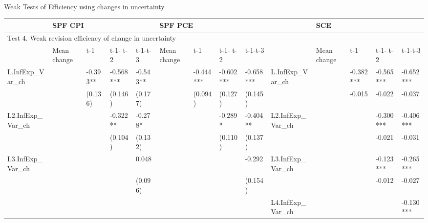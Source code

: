 \documentclass{beamer}
\begin{document}
\begin{frame}{Weak Tests of Efficiency using changes in uncertainty}
\begin{adjustbox}{width=\textwidth}
	\begin{threeparttable}
				\label{WeakRevEfficiency}
		\begin{tabular}{llllllllllllll}
			\hline 
			& \multicolumn{4}{l}{SPF CPI}                     & \multicolumn{4}{l}{SPF PCE}                       &                      & \multicolumn{4}{l}{SCE}                           \\
			\hline 
			\multicolumn{14}{l}{Test 4. Weak revision efficiency of change in uncertainty}                \\
			\hline                                                                                                                 
			& Mean change & t-1       & t-1- t-2  & t-1-t-3   & Mean change   & t-1       & t-1- t-2  & t-1-t-3   &                      & Mean change   & t-1       & t-1- t-2  & t-1-t-3   \\
			\hline 
			L.InfExp\_Var\_ch    &             & -0.393**  & -0.568*** & -0.543**  &               & -0.444*** & -0.602*** & -0.658*** & L.InfExp\_Var\_ch    &               & -0.382*** & -0.565*** & -0.652*** \\
			&             & (0.136)   & (0.146)   & (0.177)   &               & (0.094)   & (0.127)   & (0.145)   &                      &               & -0.015    & -0.022    & -0.037    \\
			L2.InfExp\_Var\_ch   &             &           & -0.322**  & -0.278*   &               &           & -0.289*   & -0.404**  & L2.InfExp\_Var\_ch   &               &           & -0.300*** & -0.406*** \\
			&             &           & (0.104)   & (0.132)   &               &           & (0.110)   & (0.137)   &                      &               &           & -0.021    & -0.031    \\
			L3.InfExp\_Var\_ch   &             &           &           & 0.048     &               &           &           & -0.292    & L3.InfExp\_Var\_ch   &               &           & -0.123*** & -0.265*** \\
			&             &           &           & (0.096)   &               &           &           & (0.154)   &                      &               &           & -0.012    & -0.027    \\
			&             &           &           &           &               &           &           &           & L4.InfExp\_Var\_ch   &               &           &           & -0.130*** \\

\end{tabular}
\end{threeparttable}
\end{adjustbox}
\end{frame}
\end{document}
